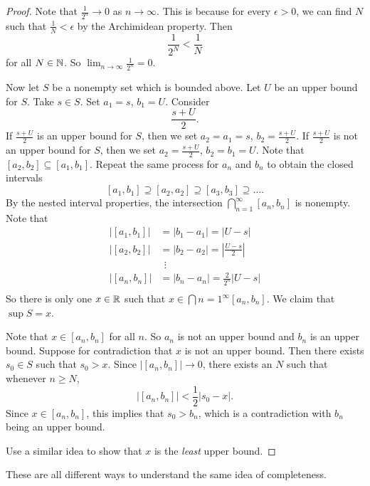 \begin{proof}
  Note that $\frac{1}{2^n} \to 0$ as $n \to \infty$.
  This is because for
  every $\epsilon > 0$, we can find $N$ such that
  $\frac{1}{N} < \epsilon$ by the Archimidean property.
  Then
  \[
    \frac{1}{2^N} < \frac{1}{N}
  \]
  for all $N \in \mathbb{N}$. So
  $\lim_{n \to \infty} \frac{1}{2^n} = 0$.

  Now let $S$ be a nonempty set which is bounded above.
  Let $U$ be an upper bound for $S$. Take $s \in S$.
  Set $a_1 = s$, $b_1 = U$. Consider
  \[
    \frac{s + U}{2}
  .\]
  If $\frac{s + U}{2}$ is an upper bound for $S$, then
  we set $a_2 = a_1 = s$, $b_2 = \frac{s + U}{2}$. If
  $\frac{s + U}{2}$ is not an upper bound for $S$, then
  we set $a_2 = \frac{s + U}{2}$, $b_2 = b_1 = U$.
  Note that $[a_2, b_2] \subseteq [a_1, b_1]$.
  Repeat the same process for $a_n$ and $b_n$ to
  obtain the closed intervals
  \[[a_1, b_1] \supseteq [a_2, a_2] \supseteq [a_3, b_3] \supseteq \dots.\]
  By the nested interval properties, the intersection
  $\bigcap_{n = 1}^\infty [a_n, b_n]$ is nonempty.
  Note that
  \begin{align*}
    \left|[a_1, b_1]\right| &= |b_1 - a_1| = |U - s| \\
    \left|[a_2, b_2]\right| &= |b_2 - a_2| = \left|\frac{U - s}{2}\right| \\
                            &\ \ \vdots \\
    \left|[a_n, b_n]\right| &= |b_n - a_n| = \frac{2}{2^n}|U - s| \\
  \end{align*}
  So there is only one $x \in \mathbb{R}$ such that
  $x \in \bigcap{n = 1}^\infty [a_n, b_n]$. We claim
  that $\sup S = x$.

  Note that $x \in [a_n, b_n]$ for all $n$. So
  $a_n$ is not an upper bound and $b_n$ is an upper bound.
  Suppose for contradiction that $x$ is not an upper bound.
  Then there exists $s_0 \in S$ such that $s_0 > x$.
  Since $|[a_n, b_n]| \to 0$, there exists an $N$ such
  that whenever $n \ge N$,
  \[
    |[a_n, b_n]| < \frac{1}{2}|s_0 - x|
  .\]
  Since $x \in [a_n, b_n]$, this implies that $s_0 > b_n$,
  which is a contradiction with $b_n$ being an upper bound.

  Use a similar idea to show that $x$ is the \textit{least}
  upper bound.
\end{proof}

\begin{remark}
  These are all different ways to understand the
  same idea of completeness.
\end{remark}
